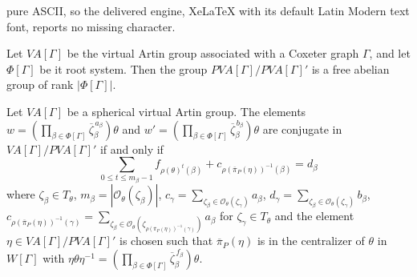 \documentclass[10pt,a4paper]{amsart}
\begin{document}
pure ASCII, so the delivered engine, XeLaTeX with its default Latin Modern text font, reports no missing character.
\begin{proposition}\label{prop:freeabelian}
Let $VA[\Gamma]$ be the virtual Artin group associated with a Coxeter graph $\Gamma$, and let $\Phi[\Gamma]$ be it root system. Then the group $PVA[\Gamma]/PVA[\Gamma]'$ is a free abelian group of rank $|\Phi[\Gamma]|$.
\end{proposition}

\begin{theorem}\label{crystallographic conjugacy}
Let $VA[\Gamma]$ be a spherical virtual Artin group. The elements $w=(\prod_{\beta \in \Phi[\Gamma]} \overline{\zeta}_{\beta}^{\,a_\beta})\theta$ and $w'=(\prod_{\beta \in \Phi[\Gamma]} \overline{\zeta}_{\beta}^{ \,b_\beta})\theta$ are conjugate in $VA[\Gamma]/PVA[\Gamma]'$ if and only if 
$$\sum_{0\le t \le m_\beta-1}f_{\rho(\theta)^{t}(\beta)}+c_{\rho(\overline{\pi}_P(\eta))^{-1}(\beta)}=d_\beta$$
where $\zeta_\beta \in T_\theta$, $m_\beta=|\mathcal{O}_{\theta}(\zeta_{\beta})|$, $c_{\gamma}=\sum_{\zeta_\beta\in\mathcal{O}_{\theta}(\zeta_{\gamma})}{a_\beta}$, $d_{\gamma}=\sum_{\zeta_\beta\in\mathcal{O}_{\theta}(\zeta_{\gamma})}{b_\beta}$, $c_{\rho(\overline{\pi}_P(\eta))^{-1}(\gamma)}=\sum_{\zeta_\beta\in\mathcal{O}_{\theta}(\zeta_{\rho(\overline{\pi}_P(\eta))^{-1}(\gamma)})}{a_\beta}$ for $\zeta_\gamma \in T_\theta$ and the element  $\eta\in VA[\Gamma]/PVA[\Gamma]'$ is chosen such that $\overline{\pi}_P(\eta)$ is in the centralizer of $\theta$ in $W[\Gamma]$ with $\eta\theta\eta^{-1}= (\prod_{\beta\in \Phi[\Gamma]} \overline{\zeta}_{\beta}^{\,f_{\beta}})\theta$.
\end{theorem}
\end{document}
